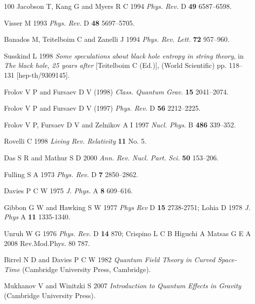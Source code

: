 \documentclass[12pt]{iopart}
\begin{document}
\begin{thebibliography}{100}
Jacobson T,  Kang G and Myers R C 1994  \textit{Phys. Rev.} D \textbf{49}   6587--6598.

Visser M 1993  \textit{ Phys. Rev.} D \textbf{48}  5697--5705.

Banados M, Teitelboim C and  Zanelli J 1994 \textit{Phys. Rev. Lett.} \textbf{72}  957--960.

Susskind L 1998 \textit{Some speculations about black hole entropy in string theory}, in
  \textit{The black hole, 25 years after}  [Teitelboim C (Ed.)], (World Scientific) 
  pp. 118--131 [hep-th/9309145].
  
Frolov V P and  Fursaev D V (1998) \textit{Class.  Quantum Grav.} \textbf{15}  2041--2074.

Frolov V P and  Fursaev D V (1997)  \textit{Phys. Rev.} D \textbf{56}  2212--2225.

Frolov V P, Fursaev D V and  Zelnikov A I 1997 \textit{Nucl. Phys.} B \textbf{486} 339--352.
 
Rovelli C 1998  \textit{Living Rev. Relativity } \textbf{11}  No. 5.

Das S R and    Mathur S D  2000  \textit{Ann. Rev. Nucl. Part. Sci.} \textbf{50}  153--206.
  
Fulling S A 1973  \textit{Phys. Rev.} D \textbf{7} 2850--2862.

Davies P C W 1975  \textit{J. Phys.} A \textbf{8}  609--616.


Gibbon G W and Hawking S W 1977 \textit{Phys Rev } D \textbf{15} 2738-2751;
Lohia D 1978 \textit{J. Phys} A \textbf{11} 1335-1340.


  
Unruh W G  1976 \textit{Phys. Rev.} D \textbf{14}  870;
Crispino L C B Higuchi A Matsas G E A 2008 Rev.Mod.Phys. 80 787.


Birrel N D and  Davies P C W 1982 \textit{Quantum Field Theory in Curved Space-Time}
  (Cambridge University Press, Cambridge).



Mukhanov V and  Winitzki S 2007 
\textit{Introduction to Quantum Effects in Gravity} (Cambridge University Press).

  


\end{thebibliography}
\end{document}
